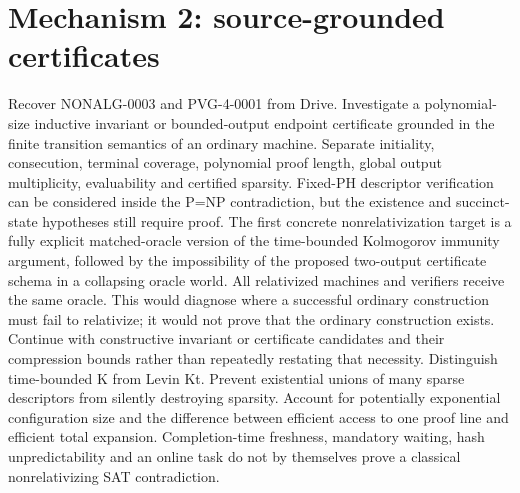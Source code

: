 \documentclass[11pt]{article}
\begin{document}
\section{Mechanism 2: source-grounded certificates}
Recover NONALG-0003 and PVG-4-0001 from Drive. Investigate a polynomial-size inductive invariant or bounded-output endpoint certificate grounded in the finite transition semantics of an ordinary machine. Separate initiality, consecution, terminal coverage, polynomial proof length, global output multiplicity, evaluability and certified sparsity. Fixed-PH descriptor verification can be considered inside the P=NP contradiction, but the existence and succinct-state hypotheses still require proof.
The first concrete nonrelativization target is a fully explicit matched-oracle version of the time-bounded Kolmogorov immunity argument, followed by the impossibility of the proposed two-output certificate schema in a collapsing oracle world. All relativized machines and verifiers receive the same oracle. This would diagnose where a successful ordinary construction must fail to relativize; it would not prove that the ordinary construction exists. Continue with constructive invariant or certificate candidates and their compression bounds rather than repeatedly restating that necessity.
Distinguish time-bounded K from Levin Kt. Prevent existential unions of many sparse descriptors from silently destroying sparsity. Account for potentially exponential configuration size and the difference between efficient access to one proof line and efficient total expansion. Completion-time freshness, mandatory waiting, hash unpredictability and an online task do not by themselves prove a classical nonrelativizing SAT contradiction.
\end{document}
